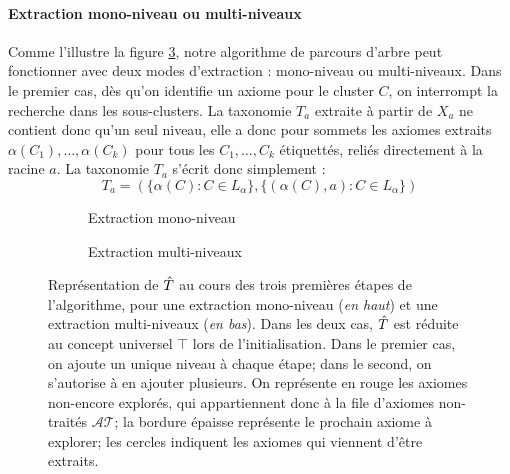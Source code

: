 \paragraph{Extraction mono-niveau ou multi-niveaux}


Comme l'illustre la figure \ref{fig:texp-tree-expansion}, notre algorithme de parcours d'arbre peut fonctionner avec deux modes d'extraction : mono-niveau ou multi-niveaux. Dans le premier cas, dès qu'on identifie un axiome pour le cluster $C$, on interrompt la recherche dans les sous-clusters. La taxonomie $T_a$ extraite à partir de $X_a$ ne contient donc qu'un seul niveau, elle a donc pour sommets les axiomes extraits $\alpha(C_1), \ldots, \alpha(C_k)$ pour tous les $C_1, \ldots, C_k$ étiquettés, reliés directement à la racine $a$. La taxonomie $T_a$ s'écrit donc simplement :
\begin{equation}
    T_a = ( \{ \alpha(C) : C \in L_\alpha \}, \{ (\alpha(C), a) : C \in L_\alpha \} )
\end{equation}

\begin{figure}[h]
    \centering
    
    \begin{subfigure}{\textwidth}
        \centering
        
        \caption{Extraction mono-niveau}
        \label{subfig:tree-singlelevel}
    \end{subfigure}
    
    \begin{subfigure}{\textwidth}
        \centering
        
        \caption{Extraction multi-niveaux}
        \label{subfig:tree-multilevel}
    \end{subfigure}
    
    \caption[Extraction mono-niveau et extraction multi-niveaux]{Représentation de $\hat{T}$ au cours des trois premières étapes de l'algorithme, pour une extraction mono-niveau (\textit{en haut}) et une extraction multi-niveaux (\textit{en bas}). Dans les deux cas, $\hat{T}$ est réduite au concept universel $\top$ lors de l'initialisation. Dans le premier cas, on ajoute un unique niveau à chaque étape; dans le second, on s'autorise à en ajouter plusieurs. On représente en rouge les axiomes non-encore explorés, qui appartiennent donc à la file d'axiomes non-traités $\mathcal{AT}$; la bordure épaisse représente le prochain axiome à explorer; les cercles indiquent les axiomes qui viennent d'être extraits.}
    \label{fig:texp-tree-expansion}
\end{figure}


